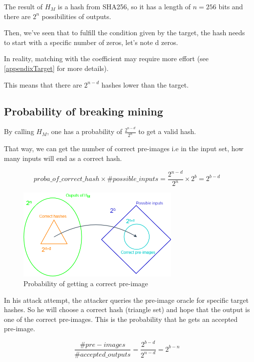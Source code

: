The result of $H_M$ is a hash from SHA256, so it has a length of $n = 256$ bits and there are $2^n$ possibilities of outputs. \newline

Then, we've seen that to fulfill the condition given by the target, the hash needs to start with a specific number of zeros, let's note d zeros.

In reality, matching with the coefficient may require more effort (see \ref{appendixTarget} for more details). \newline

This means that there are $2^{n-d}$ hashes lower than the target.

	\subsection{Probability of breaking mining}


By calling $H_M$, one has a probability of $\frac{2^{n-d}}{2^n}$ to get a valid hash.

That way, we can get the number of correct pre-images i.e in the input set, how many inputs will end as a correct hash.

\begin{equation}
proba\_of\_correct\_hash \times \#possible\_inputs = \frac{2^{n-d}}{2^n} \times 2^b = 2^{b-d}
\end{equation}
\newline

\begin{figure}[ht]
\centering
\includegraphics[width=8cm]{Figures/probaSuccess}
\caption{Probability of getting a correct pre-image}
\end{figure}
\medskip

In his attack attempt, the attacker queries the pre-image oracle for specific target hashes. So he will choose a correct hash (triangle set) and hope that the output is one of the correct pre-images. This is the probability that he gets an accepted pre-image.

\begin{equation}
\frac{\#pre-images}{\#accepted\_outputs} = \frac{2^{b-d}}{2^{n-d}} = 2^{b-n}
\end{equation}
\newline

